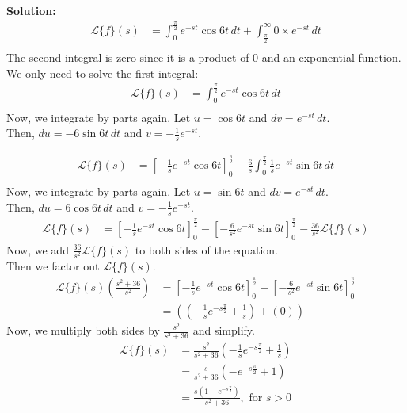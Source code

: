 \documentclass{article}
\begin{document}
    \textbf{Solution:} \\
    \begin{align*}
        \mathcal{L}\{f\}(s) &= \int_{0}^{\frac{\pi}{2}} e^{-st}\cos{6t} \, dt + \int_{\frac{\pi}{2}}^{\infty} 0 \times e^{-st} \, dt \\
    \end{align*}
    The second integral is zero since it is a product of 0 and an exponential function. We only need to solve the first integral:
    \begin{align*}
        \mathcal{L}\{f\}(s) &= \int_{0}^{\frac{\pi}{2}} e^{-st}\cos{6t} \, dt \\
    \end{align*}
    Now, we integrate by parts again. Let $u = \cos{6t}$ and $dv = e^{-st}\, dt$. \\
    Then, $du = -6\sin{6t}\, dt$ and $v = -\frac{1}{s}e^{-st}$.

    \begin{align*}
        \mathcal{L}\{f\}(s) &= \left[ -\frac{1}{s}e^{-st}\cos{6t}\right]_{0}^{\frac{\pi}{2}} - \frac{6}{s}\int_{0}^{\frac{\pi}{2}} \frac{1}{s}e^{-st}\sin{6t}\, dt \\   
    \end{align*}
    Now, we integrate by parts again. Let $u = \sin{6t}$ and $dv = e^{-st}\, dt$. \\
    Then, $du = 6\cos{6t}\, dt$ and $v = -\frac{1}{s}e^{-st}$. \\
    \begin{align*}
        \mathcal{L}\{f\}(s) &= \left[ -\frac{1}{s}e^{-st}\cos{6t}\right]_{0}^{\frac{\pi}{2}} - \left[ -\frac{6}{s^{2}}e^{-st}\sin{6t}\right]_{0}^{\frac{\pi}{2}} - \frac{36}{s^{2}}\mathcal{L}\{f\}(s)
    \end{align*}    
    Now, we add $\frac{36}{s^{2}}\mathcal{L}\{f\}(s)$ to both sides of the equation. \\
    Then we factor out $\mathcal{L}\{f\}(s)$. \\
    \begin{align*}
        \mathcal{L}\{f\}(s)\left(\frac{s^{2} + 36}{s^{2}}\right) &= \left[ -\frac{1}{s}e^{-st}\cos{6t}\right]_{0}^{\frac{\pi}{2}} - \left[ -\frac{6}{s^{2}}e^{-st}\sin{6t}\right]_{0}^{\frac{\pi}{2}} \\
        &= \left( \left(-\frac{1}{s}e^{-s\frac{\pi}{2}} + \frac{1}{s}\right) + \left(0\right)\right) 
    \end{align*}
    Now, we multiply both sides by $\frac{s^{2}}{s^{2} + 36}$ and simplify. \\
    \begin{align*}
        \mathcal{L}\{f\}(s) &= \frac{s^{2}}{s^{2} + 36}\left(-\frac{1}{s}e^{-s\frac{\pi}{2}} + \frac{1}{s}\right) \\
        &= \frac{s}{s^{2} + 36}(-e^{-s\frac{\pi}{2}} + 1) \\
        &= \frac{s(1 - e^{-s\frac{\pi}{2}})}{s^{2} + 36}, \text{ for } s > 0 \\
    \end{align*}
\end{document}
